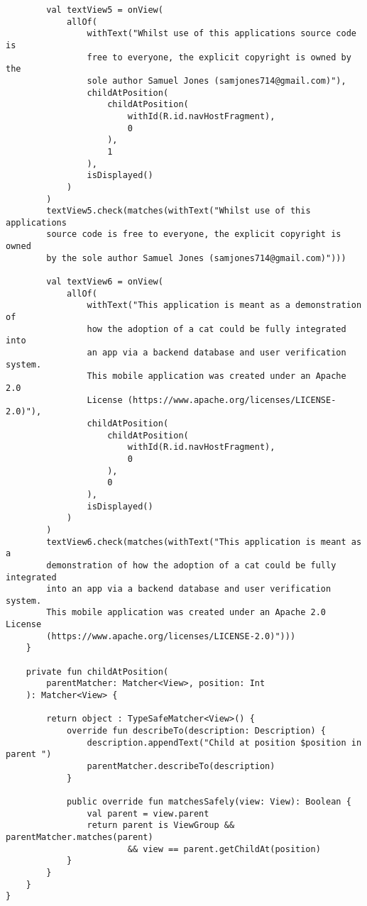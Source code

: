 \begin{verbatim}
        val textView5 = onView(
            allOf(
                withText("Whilst use of this applications source code is
                free to everyone, the explicit copyright is owned by the 
                sole author Samuel Jones (samjones714@gmail.com)"),
                childAtPosition(
                    childAtPosition(
                        withId(R.id.navHostFragment),
                        0
                    ),
                    1
                ),
                isDisplayed()
            )
        )
        textView5.check(matches(withText("Whilst use of this applications
        source code is free to everyone, the explicit copyright is owned 
        by the sole author Samuel Jones (samjones714@gmail.com)")))

        val textView6 = onView(
            allOf(
                withText("This application is meant as a demonstration of 
                how the adoption of a cat could be fully integrated into 
                an app via a backend database and user verification system.
                This mobile application was created under an Apache 2.0 
                License (https://www.apache.org/licenses/LICENSE-2.0)"),
                childAtPosition(
                    childAtPosition(
                        withId(R.id.navHostFragment),
                        0
                    ),
                    0
                ),
                isDisplayed()
            )
        )
        textView6.check(matches(withText("This application is meant as a
        demonstration of how the adoption of a cat could be fully integrated
        into an app via a backend database and user verification system. 
        This mobile application was created under an Apache 2.0 License 
        (https://www.apache.org/licenses/LICENSE-2.0)")))
    }

    private fun childAtPosition(
        parentMatcher: Matcher<View>, position: Int
    ): Matcher<View> {

        return object : TypeSafeMatcher<View>() {
            override fun describeTo(description: Description) {
                description.appendText("Child at position $position in parent ")
                parentMatcher.describeTo(description)
            }

            public override fun matchesSafely(view: View): Boolean {
                val parent = view.parent
                return parent is ViewGroup && parentMatcher.matches(parent)
                        && view == parent.getChildAt(position)
            }
        }
    }
}
\end{verbatim}